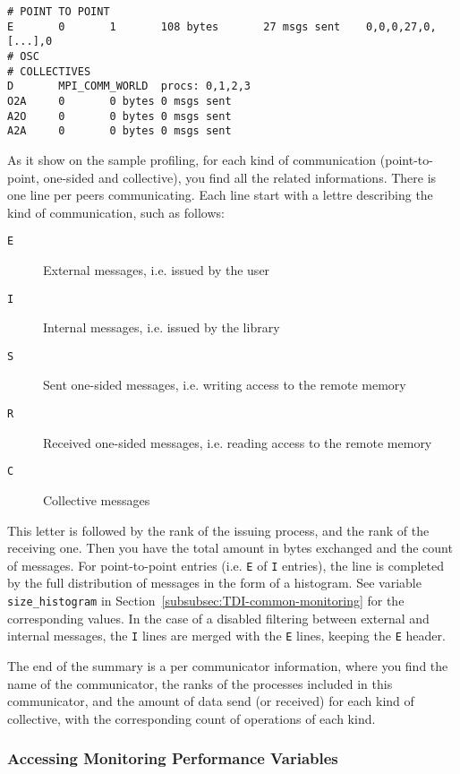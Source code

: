 \documentclass[notitlepage]{article}
\newcommand{\brkunds}[0]{\allowbreak\_}
\begin{document}
\begin{verbatim}
# POINT TO POINT
E       0       1       108 bytes       27 msgs sent    0,0,0,27,0,[...],0
# OSC
# COLLECTIVES
D       MPI_COMM_WORLD  procs: 0,1,2,3
O2A     0       0 bytes 0 msgs sent
A2O     0       0 bytes 0 msgs sent
A2A     0       0 bytes 0 msgs sent
\end{verbatim}

As it show on the sample profiling, for each kind of communication
(point-to-point, one-sided and collective), you find all the related
informations. There is one line per peers communicating. Each line
start with a lettre describing the kind of communication, such as
follows:

\begin{description}
\item [{\tt E}] External messages, i.e. issued by the user
\item [{\tt I}] Internal messages, i.e. issued by the library
\item [{\tt S}] Sent one-sided messages, i.e. writing access to the remote memory
\item [{\tt R}] Received one-sided messages, i.e. reading access to the remote memory
\item [{\tt C}] Collective messages
\end{description}

This letter is followed by the rank of the issuing process, and the
rank of the receiving one. Then you have the total amount in bytes
exchanged and the count of messages. For point-to-point entries
(i.e. {\tt E} of {\tt I} entries), the line is completed by the full
distribution of messages in the form of a histogram. See variable {\tt
  size\brkunds{}histogram} in
Section~\ref{subsubsec:TDI-common-monitoring} for the corresponding
values. In the case of a disabled filtering between external and
internal messages, the {\tt I} lines are merged with the {\tt E}
lines, keeping the {\tt E} header.

The end of the summary is a per communicator information, where you
find the name of the communicator, the ranks of the processes included
in this communicator, and the amount of data send (or received) for
each kind of collective, with the corresponding count of operations of
each kind.

\subsubsection{Accessing Monitoring Performance Variables}
\end{document}
